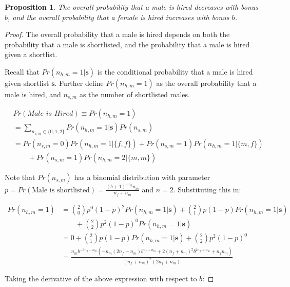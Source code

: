 \documentclass[11pt]{article}
\newtheorem{proposition}{Proposition}
\begin{document}
\begin{proposition}
    The overall probability that a male is hired decreases with bonus $b$, and the overall probability that a female is hired increases with bonus $b$.
\end{proposition}

\begin{proof}
    The overall probability that a male is hired depends on both the probability that a male is shortlisted, and the probability that a male is hired given a shortlist.

    Recall that $Pr(n_{h,m}=1|\bm{s})$ is the conditional probability that a male is hired given shortlist $\bm{s}$. Further define $Pr(n_{h,m}=1)$ as the overall probability that a male is hired, and $n_{s,m}$ as the number of shortlisted males.

    \begin{align*}
         & Pr(\textit{Male is Hired}) \equiv Pr(n_{h,m}=1)                               \\
         & = \sum\nolimits_{n_{s,m} \in \{0,1,2\}} Pr(n_{h,m}=1|\bm{s}) Pr(n_{s,m})      \\
         & = Pr(n_{s,m} = 0)Pr(n_{h,m}=1|\{f,f\}) + Pr(n_{s,m} = 1)Pr(n_{h,m}=1|\{m,f\}) \\
         & \qquad + Pr(n_{s,m} = 1)Pr(n_{h,m}=2|\{m,m\})
    \end{align*}

    Note that $Pr(n_{s,m})$ has a binomial distribution with parameter $p=Pr(\text{Male is shortlisted})=\frac{(b+1)^{-n_f} n_m}{n_f+n_m}$ and $n=2$. Substituting this in:

    \begin{align*}
        Pr(n_{h,m}=1) & = \binom{2}{0}p^0(1-p)^2 Pr(n_{h,m}=1|\bm{s}) +  \binom{2}{1}p(1-p) Pr(n_{h,m}=1|\bm{s})                                           \\
                      & \qquad + \binom{2}{2}p^2(1-p)^0 Pr(n_{h,m}=1|\bm{s})                                                                               \\
                      & =  0 + \binom{2}{1}p(1-p) Pr(n_{h,m}=1|\bm{s}) + \binom{2}{2}p^2(1-p)^0                                                            \\
                      & = \frac{n_m b^{-3 n_f-n_m} \left(-n_m (2 n_f+n_m) b^{n_f+n_m}+2 (n_f+n_m)^2 b^{2 n_f+n_m}+n_f n_m\right)}{(n_f+n_m)^2 (2 n_f+n_m)}
    \end{align*}


    Taking the derivative of the above expression with respect to $b$:


\end{proof}
\end{document}
